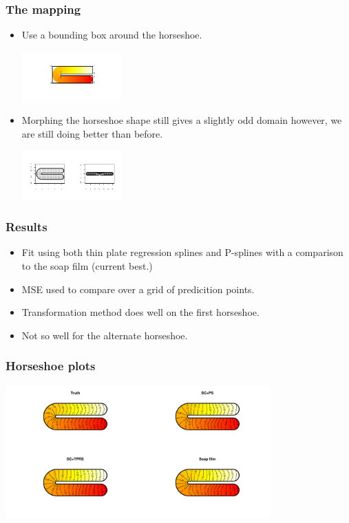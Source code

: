 \documentclass[ignorenonframetext]{beamer} %
\newcommand{\bc}{\begin{center}}
\newcommand{\ec}{\end{center}}
\newcommand{\bi}{\begin{itemize}}
\newcommand{\ei}{\end{itemize}}
\begin{document}
\begin{frame}
	\frametitle{The mapping}
      \bi
         \item Use a bounding box around the horseshoe.
      \bc
         \includegraphics[height=0.75in, trim=1in 1in 1in 0.75in]{figs/hswithboundingbox} 
      \ec
         \item Morphing the horseshoe shape still gives a slightly odd domain however, we are still doing better than before.
      \bc
          \includegraphics[height=0.75in, trim=1in 1in 1in 0.75in]{figs/hsgridmapping} 
      \ec
      \ei
\end{frame}



\begin{frame}
	\frametitle{Results}
       \bi
         \item Fit using both thin plate regression splines and P-splines with a comparison to the soap film (current best.) 
         \item MSE used to compare over a grid of predicition points.
         \item Transformation method does well on the first horseshoe.
         \item Not so well for the alternate horseshoe. 
        \ei
\end{frame}


\begin{frame}
	\frametitle{Horseshoe plots}
            \centering
          \includegraphics[width=4in,trim=2in 1in 2in 1in]{figs/compsmooth}
\end{frame}
\end{document}
